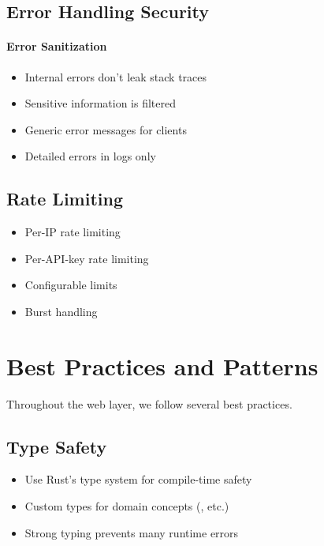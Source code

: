 \subsection{Error Handling Security}

\paragraph{Error Sanitization}

\begin{itemize}
  \item Internal errors don't leak stack traces
  \item Sensitive information is filtered
  \item Generic error messages for clients
  \item Detailed errors in logs only
\end{itemize}

\subsection{Rate Limiting}

\begin{itemize}
  \item Per-IP rate limiting
  \item Per-API-key rate limiting
  \item Configurable limits
  \item Burst handling
\end{itemize}

\section{Best Practices and Patterns}
\label{sec:best-practices}

Throughout the web layer, we follow several best practices.

\subsection{Type Safety}

\begin{itemize}
  \item Use Rust's type system for compile-time safety
  \item Custom types for domain concepts (, etc.)
  \item Strong typing prevents many runtime errors
\end{itemize}

